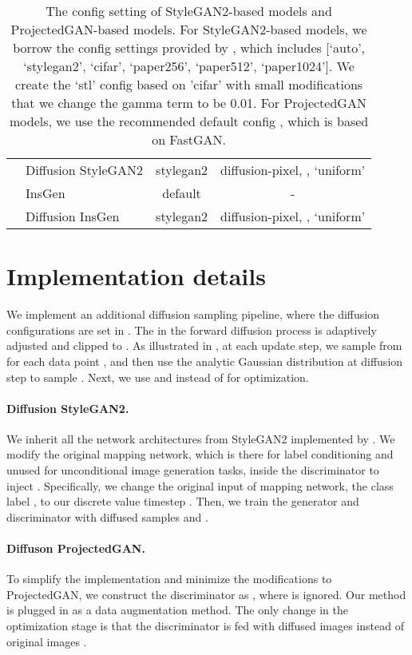 \documentclass{article} \usepackage{iclr2023_conference,times}
\theoremstyle{plain}
\theoremstyle{definition}
\theoremstyle{remark}
\begin{document}
\begin{table}[t]
{\begin{tabular}{l | l | c | c}
        & Diffusion StyleGAN2    &  stylegan2 & diffusion-pixel, , `uniform' \\
        & InsGen    &  default & - \\
        & Diffusion InsGen & stylegan2 & diffusion-pixel, , `uniform' \\
         \bottomrule
    \end{tabular}}
    \caption{\small  The config setting of StyleGAN2-based models and ProjectedGAN-based models. For StyleGAN2-based models, we borrow the config settings provided by \citet{karras2020training}, which includes [`auto', `stylegan2', `cifar', `paper256', `paper512', `paper1024']. We create the `stl' config based on 'cifar' with small modifications that we change the gamma term to be 0.01. For ProjectedGAN models, we use the recommended default config \citep{sauer2021projected}, which is based on FastGAN.  }
    \label{tab:model_config}
\end{table}

\section{Implementation details} \label{sec:implementation}

We implement an additional diffusion sampling pipeline, where the diffusion configurations are set in . The  in the forward diffusion process is adaptively adjusted and clipped to . As illustrated in , at each update step, we sample  from  for each data point , and then use the analytic Gaussian distribution at diffusion step  to sample . Next, we use  and  instead of  for optimization. 

\paragraph{Diffusion StyleGAN2. } We inherit all the network architectures from StyleGAN2 implemented by \citet{karras2020training}. We modify the original mapping network, which is there for label conditioning and unused for unconditional image generation tasks, inside the discriminator to inject . Specifically, we change the original input of mapping network, the class label , to our discrete value timestep . Then, we train the generator and discriminator with diffused samples  and .

\paragraph{Diffuson ProjectedGAN. } To simplify the implementation and minimize the modifications to ProjectedGAN, we construct the discriminator as , where  is ignored. Our method is plugged in as a data augmentation method. The only change in the optimization stage is that the discriminator is fed with diffused images  instead of original images .
\end{document}
